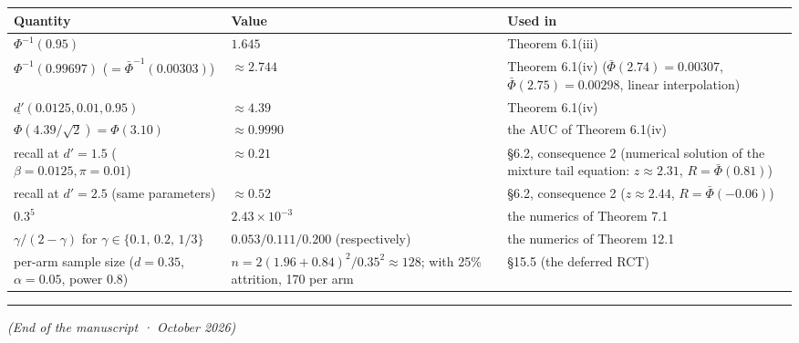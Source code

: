 \documentclass[
  11pt]{article}
\begin{document}
\begin{longtable}[]{@{}
  >{\raggedright\arraybackslash}p{}
  >{\raggedright\arraybackslash}p{}
  >{\raggedright\arraybackslash}p{}@{}}
\toprule\noalign{}
\begin{minipage}[b]{\linewidth}\raggedright
Quantity
\end{minipage} & \begin{minipage}[b]{\linewidth}\raggedright
Value
\end{minipage} & \begin{minipage}[b]{\linewidth}\raggedright
Used in
\end{minipage} \\
\midrule\noalign{}
\endhead
\bottomrule\noalign{}
\endlastfoot
\(\Phi^{-1}(0.95)\) & \(1.645\) & Theorem 6.1(iii) \\
\(\Phi^{-1}(0.99697)\) (\(=\bar\Phi^{-1}(0.00303)\)) & \(\approx 2.744\)
& Theorem 6.1(iv) (\(\bar\Phi(2.74)=0.00307\),
\(\bar\Phi(2.75)=0.00298\), linear interpolation) \\
\(\underline{d'}(0.0125, 0.01, 0.95)\) & \(\approx 4.39\) & Theorem
6.1(iv) \\
\(\Phi(4.39/\sqrt2) = \Phi(3.10)\) & \(\approx 0.9990\) & the AUC of
Theorem 6.1(iv) \\
recall at \(d'=1.5\) (\(\beta=0.0125, \pi=0.01\)) & \(\approx 0.21\) &
§6.2, consequence 2 (numerical solution of the mixture tail equation:
\(z \approx 2.31\), \(R = \bar\Phi(0.81)\)) \\
recall at \(d'=2.5\) (same parameters) & \(\approx 0.52\) & §6.2,
consequence 2 (\(z \approx 2.44\), \(R = \bar\Phi(-0.06)\)) \\
\(0.3^5\) & \(2.43\times10^{-3}\) & the numerics of Theorem 7.1 \\
\(\gamma/(2-\gamma)\) for \(\gamma \in \{0.1,\, 0.2,\, 1/3\}\) &
\(0.053 / 0.111 / 0.200\) (respectively) & the numerics of Theorem
12.1 \\
per-arm sample size (\(d=0.35\), \(\alpha=0.05\), power \(0.8\)) &
\(n = 2(1.96+0.84)^2/0.35^2 \approx 128\); with 25\% attrition, 170 per
arm & §15.5 (the deferred RCT) \\
\end{longtable}

\begin{center}\rule{0.5\linewidth}{0.5pt}\end{center}

\emph{(End of the manuscript · October 2026)}
\end{document}
